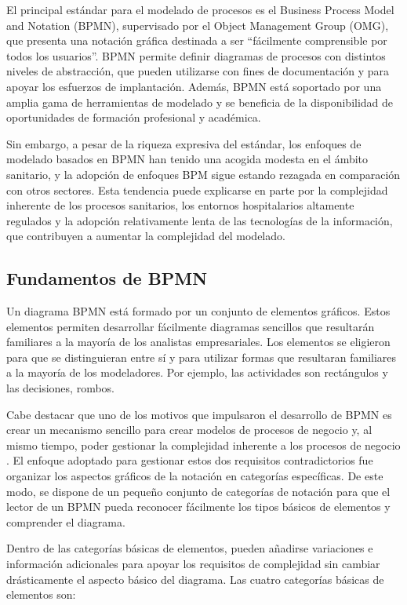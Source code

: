 El principal estándar para el modelado de procesos es el Business Process Model and Notation (BPMN), supervisado por el Object Management Group (OMG), que presenta una notación gráfica destinada a ser ``fácilmente comprensible por todos los usuarios''.
BPMN permite definir diagramas de procesos con distintos niveles de abstracción, que pueden utilizarse con fines de documentación y para apoyar los esfuerzos de implantación.
Además, BPMN está soportado por una amplia gama de herramientas de modelado y se beneficia de la disponibilidad de oportunidades de formación profesional y académica.

Sin embargo, a pesar de la riqueza expresiva del estándar, los enfoques de modelado basados en BPMN han tenido una acogida modesta en el ámbito sanitario, y la adopción de enfoques BPM sigue estando rezagada en comparación con otros sectores.
Esta tendencia puede explicarse en parte por la complejidad inherente de los procesos sanitarios, los entornos hospitalarios altamente regulados y la adopción relativamente lenta de las tecnologías de la información, que contribuyen a aumentar la complejidad del modelado.

\subsection{Fundamentos de BPMN}

Un diagrama BPMN está formado por un conjunto de elementos gráficos.
Estos elementos permiten desarrollar fácilmente diagramas sencillos que resultarán familiares a la mayoría de los analistas empresariales.
Los elementos se eligieron para que se distinguieran entre sí y para utilizar formas que resultaran familiares a la mayoría de los modeladores.
Por ejemplo, las actividades son rectángulos y las decisiones, rombos.

Cabe destacar que uno de los motivos que impulsaron el desarrollo de BPMN es crear un mecanismo sencillo para crear modelos de procesos de negocio y, al mismo tiempo, poder gestionar la complejidad inherente a los procesos de negocio \cite{white_introduction_2004}.
El enfoque adoptado para gestionar estos dos requisitos contradictorios fue organizar los aspectos gráficos de la notación en categorías específicas.
De este modo, se dispone de un pequeño conjunto de categorías de notación para que el lector de un BPMN pueda reconocer fácilmente los tipos básicos de elementos y comprender el diagrama.

Dentro de las categorías básicas de elementos, pueden añadirse variaciones e información adicionales para apoyar los requisitos de complejidad sin cambiar drásticamente el aspecto básico del diagrama.
Las cuatro categorías básicas de elementos son:

